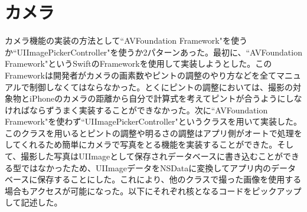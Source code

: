 \section{カメラ}
カメラ機能の実装の方法として``AVFoundation Framework"を使うか``UIImagePickerController"を使うか2パターンあった。最初に、``AVFoundation Framework"というSwiftのFrameworkを使用して実装しようとした。このFrameworkは開発者がカメラの画素数やピントの調整のやり方などを全てマニュアルで制御しなくてはならなかった。とくにピントの調整においては、撮影の対象物とiPhoneのカメラの距離から自分で計算式を考えてピントが合うようにしなければならずうまく実装することができなかった。次に``AVFoundation Framework"を使わず``UIImagePickerController"というクラスを用いて実装した。このクラスを用いるとピントの調整や明るさの調整はアプリ側がオートで処理をしてくれるため簡単にカメラで写真をとる機能を実装することができた。そして、撮影した写真はUIImageとして保存されデータベースに書き込むことができる型ではなかったため、UIImageデータをNSDataに変換してアプリ内のデータベースに保存することにした。これにより、他のクラスで撮った画像を使用する場合もアクセスが可能になった。以下にそれぞれ核となるコードをピックアップして記述した。

